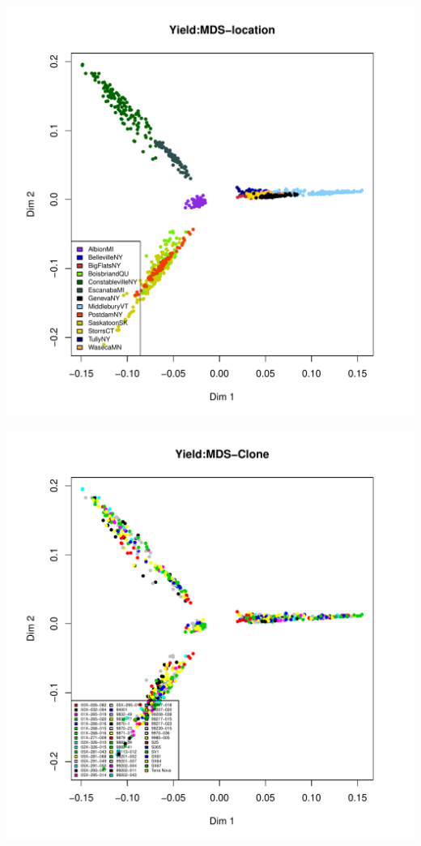 \documentclass{article}\usepackage[]{graphicx}\usepackage[]{color}
\makeatletter
\def\maxwidth{ %
  \ifdim\Gin@nat@width>\linewidth
    \linewidth
  \else
    \Gin@nat@width
  \fi
}
\newenvironment{knitrout}{}{} %
\makeatother
\begin{document}
\begin{knitrout}
\color{fgcolor}

{\centering \includegraphics[width=\maxwidth]{figure/MSDSPlotsYield-1} 

}




{\centering \includegraphics[width=\maxwidth]{figure/MSDSPlotsYield-2} 

}
\end{knitrout}
\end{document}

